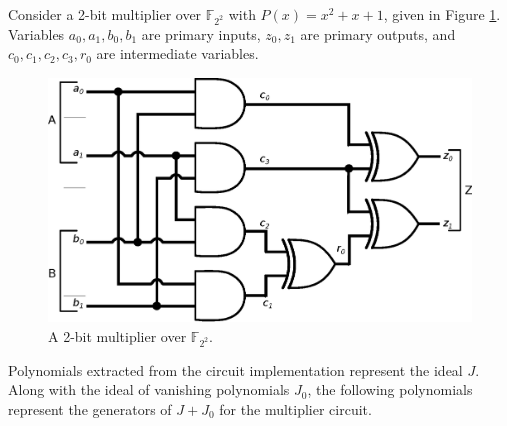 \begin{Example}
\label{exp:finalMul2Bit}
Consider a 2-bit multiplier over ${\mathbb{F}}_{2^2}$ with
$P(x)=x^{2}+x+1$, given in Figure \ref{fig:2bitmul}. Variables $a_0,
a_1, b_0, b_1$ are primary inputs, $z_0, z_1$ are primary outputs, and
$c_0, c_1, c_2, c_3, r_0$ are intermediate variables. 

\begin{figure}[bp]
\centerline{
\includegraphics[scale=0.5]{./figures/2bitmasmult.eps}
}
\caption{ A 2-bit multiplier over ${\mathbb{F}}_{2^2}$.}
\label{fig:2bitmul}
\end{figure}

Polynomials extracted from the circuit implementation represent the
ideal $J$. Along with the ideal of vanishing polynomials $J_0$, 
the following polynomials represent the generators 
of $J+J_0$ for the multiplier circuit. 


\end{Example}
